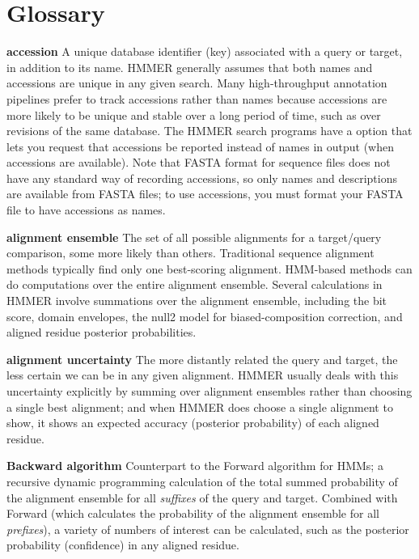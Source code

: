 
\section{Glossary}

\begin{wideitem}

\item[\textbf{accession}] A unique database identifier (key)
  associated with a query or target, in addition to its name. HMMER
  generally assumes that both names and accessions are unique in any
  given search. Many high-throughput annotation pipelines prefer to
  track accessions rather than names because accessions are more
  likely to be unique and stable over a long period of time, such as
  over revisions of the same database. The HMMER search programs have
  a  option that lets you request that accessions be
  reported instead of names in output (when accessions are
  available). Note that FASTA format for sequence files does not have
  any standard way of recording accessions, so only names and
  descriptions are available from FASTA files; to use accessions, you
  must format your FASTA file to have accessions as names.

\item[\textbf{alignment ensemble}] The set of all possible alignments
  for a target/query comparison, some more likely than others.
  Traditional sequence alignment methods typically find only one
  best-scoring alignment. HMM-based methods can do computations over
  the entire alignment ensemble. Several calculations in HMMER involve
  summations over the alignment ensemble, including the bit score,
  domain envelopes, the null2 model for biased-composition correction,
  and aligned residue posterior probabilities.

\item[\textbf{alignment uncertainty}] The more distantly related the
  query and target, the less certain we can be in any given
  alignment. HMMER usually deals with this uncertainty explicitly by
  summing over alignment ensembles rather than choosing a single best
  alignment; and when HMMER does choose a single alignment to show, it
  shows an expected accuracy (posterior probability) of each aligned
  residue.

\item[\textbf{Backward algorithm}] Counterpart to the Forward
  algorithm for HMMs; a recursive dynamic programming calculation of
  the total summed probability of the alignment ensemble for all
  \emph{suffixes} of the query and target. Combined with Forward
  (which calculates the probability of the alignment ensemble for all
  \emph{prefixes}), a variety of numbers of interest can be
  calculated, such as the posterior probability (confidence) in any
  aligned residue.


\end{wideitem}
